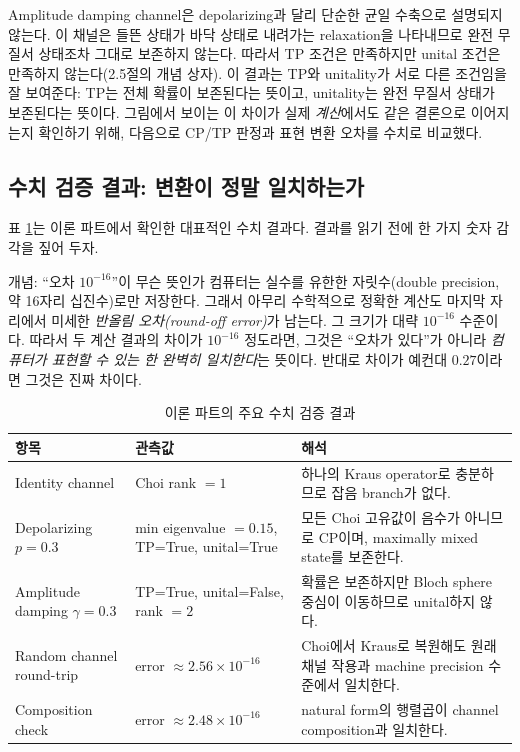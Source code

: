 \documentclass[11pt,a4paper]{article}
\begin{document}
Amplitude damping channel은 depolarizing과 달리 단순한 균일 수축으로 설명되지 않는다. 이 채널은 들뜬 상태가 바닥 상태로 내려가는 relaxation을 나타내므로 완전 무질서 상태조차 그대로 보존하지 않는다. 따라서 TP 조건은 만족하지만 unital 조건은 만족하지 않는다(2.5절의 개념 상자). 이 결과는 TP와 unitality가 서로 다른 조건임을 잘 보여준다: TP는 전체 확률이 보존된다는 뜻이고, unitality는 완전 무질서 상태가 보존된다는 뜻이다. 그림에서 보이는 이 차이가 실제 \emph{계산}에서도 같은 결론으로 이어지는지 확인하기 위해, 다음으로 CP/TP 판정과 표현 변환 오차를 수치로 비교했다.

\subsection{수치 검증 결과: 변환이 정말 일치하는가}

표 \ref{tab:theory-results}는 이론 파트에서 확인한 대표적인 수치 결과다. 결과를 읽기 전에 한 가지 숫자 감각을 짚어 두자.

\begin{conceptbox}{개념: ``오차 $10^{-16}$''이 무슨 뜻인가}
컴퓨터는 실수를 유한한 자릿수(double precision, 약 16자리 십진수)로만 저장한다. 그래서 아무리 수학적으로 정확한 계산도 마지막 자리에서 미세한 \emph{반올림 오차(round-off error)}가 남는다. 그 크기가 대략 $10^{-16}$ 수준이다. 따라서 두 계산 결과의 차이가 $10^{-16}$ 정도라면, 그것은 ``오차가 있다''가 아니라 \emph{컴퓨터가 표현할 수 있는 한 완벽히 일치한다}는 뜻이다. 반대로 차이가 예컨대 $0.27$이라면 그것은 진짜 차이다.
\end{conceptbox}

\begin{table}[H]
\centering
\small
\begin{tabularx}{\textwidth}{p{}p{}X}
\toprule
항목 & 관측값 & 해석 \\
\midrule
Identity channel & Choi rank $=1$ & 하나의 Kraus operator로 충분하므로 잡음 branch가 없다. \\
Depolarizing $p=0.3$ & min eigenvalue $=0.15$, TP=True, unital=True & 모든 Choi 고유값이 음수가 아니므로 CP이며, maximally mixed state를 보존한다. \\
Amplitude damping $\gamma=0.3$ & TP=True, unital=False, rank $=2$ & 확률은 보존하지만 Bloch sphere 중심이 이동하므로 unital하지 않다. \\
Random channel round-trip & error $\approx2.56\times10^{-16}$ & Choi에서 Kraus로 복원해도 원래 채널 작용과 machine precision 수준에서 일치한다. \\
Composition check & error $\approx2.48\times10^{-16}$ & natural form의 행렬곱이 channel composition과 일치한다. \\
\bottomrule
\end{tabularx}
\caption{이론 파트의 주요 수치 검증 결과}
\label{tab:theory-results}
\end{table}
\end{document}
